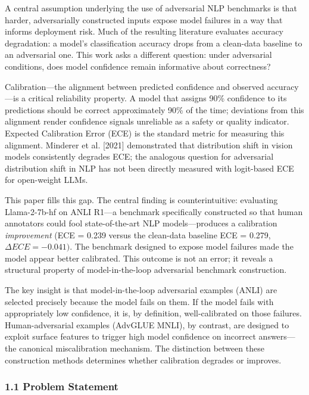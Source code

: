 
A central assumption underlying the use of adversarial NLP benchmarks is that harder, adversarially constructed inputs expose model failures in a way that informs deployment risk. Much of the resulting literature evaluates accuracy degradation: a model's classification accuracy drops from a clean-data baseline to an adversarial one. This work asks a different question: under adversarial conditions, does model confidence remain informative about correctness?

Calibration---the alignment between predicted confidence and observed accuracy---is a critical reliability property. A model that assigns 90\% confidence to its predictions should be correct approximately 90\% of the time; deviations from this alignment render confidence signals unreliable as a safety or quality indicator. Expected Calibration Error (ECE) \citep{Guo2017Calibration} is the standard metric for measuring this alignment. Minderer et al. [2021] demonstrated that distribution shift in vision models consistently degrades ECE; the analogous question for adversarial distribution shift in NLP has not been directly measured with logit-based ECE for open-weight LLMs.

This paper fills this gap. The central finding is counterintuitive: evaluating Llama-2-7b-hf on ANLI R1---a benchmark specifically constructed so that human annotators could fool state-of-the-art NLP models---produces a calibration \textit{improvement} (ECE = 0.239 versus the clean-data baseline ECE = 0.279, $\Delta ECE = -0.041)$. The benchmark designed to expose model failures made the model appear better calibrated. This outcome is not an error; it reveals a structural property of model-in-the-loop adversarial benchmark construction.

The key insight is that model-in-the-loop adversarial examples (ANLI) are selected precisely because the model fails on them. If the model fails with appropriately low confidence, it is, by definition, well-calibrated on those failures. Human-adversarial examples (AdvGLUE MNLI), by contrast, are designed to exploit surface features to trigger high model confidence on incorrect answers---the canonical miscalibration mechanism. The distinction between these construction methods determines whether calibration degrades or improves.

\subsubsection{1.1 Problem Statement}

